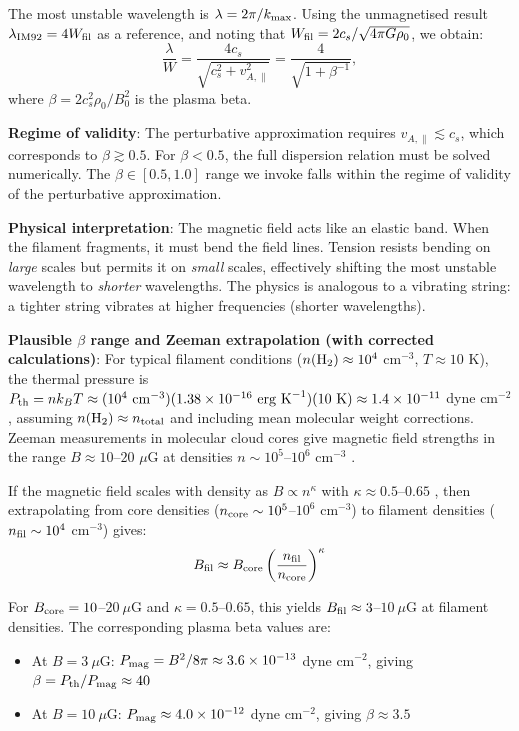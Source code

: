\documentclass[11pt,a4paper]{article}
\begin{document}
The most unstable wavelength is $\lambda = 2\pi/k_{\rm max}$. Using the unmagnetised result $\lambda_{\rm IM92} = 4W_{\rm fil}$ as a reference, and noting that $W_{\rm fil} = 2c_s/\sqrt{4\pi G\rho_0}$, we obtain:
\begin{equation}
\frac{\lambda}{W} = \frac{4c_s}{\sqrt{c_s^2 + v_{A,\parallel}^2}} = \frac{4}{\sqrt{1 + \beta^{-1}}},
\label{eq:tension_lambda}
\end{equation}
where $\beta = 2c_s^2\rho_0/B_0^2$ is the plasma beta.

\textbf{Regime of validity}: The perturbative approximation requires $v_{A,\parallel} \lesssim c_s$, which corresponds to $\beta \gtrsim 0.5$. For $\beta < 0.5$, the full dispersion relation must be solved numerically. The $\beta \in [0.5, 1.0]$ range we invoke falls within the regime of validity of the perturbative approximation.

\textbf{Physical interpretation}: The magnetic field acts like an elastic band. When the filament fragments, it must bend the field lines. Tension resists bending on \textit{large} scales but permits it on \textit{small} scales, effectively shifting the most unstable wavelength to \textit{shorter} wavelengths. The physics is analogous to a vibrating string: a tighter string vibrates at higher frequencies (shorter wavelengths).

\textbf{Plausible $\beta$ range and Zeeman extrapolation (with corrected calculations)}: For typical filament conditions ($n({\rm H_2}) \approx 10^4$ cm$^{-3}$, $T \approx 10$ K), the thermal pressure is $P_{\rm th} = n k_B T \approx (10^4~{\rm cm}^{-3})(1.38\times10^{-16}~{\rm erg~K}^{-1})(10~{\rm K}) \approx 1.4\times10^{-11}$ dyne cm$^{-2}$, assuming $n({\rm H}_2) \approx n_{\rm total}$ and including mean molecular weight corrections. Zeeman measurements in molecular cloud cores give magnetic field strengths in the range $B \approx 10$--$20$ $\mu$G at densities $n \sim 10^5$--$10^6$ cm$^{-3}$ \citep{Crutcher2012}.

If the magnetic field scales with density as $B \propto n^{\kappa}$ with $\kappa \approx 0.5$--$0.65$ \citep{Crutcher2012}, then extrapolating from core densities ($n_{\rm core} \sim 10^5$--$10^6$ cm$^{-3}$) to filament densities ($n_{\rm fil} \sim 10^4$ cm$^{-3}$) gives:
\begin{equation}
B_{\rm fil} \approx B_{\rm core} \left(\frac{n_{\rm fil}}{n_{\rm core}}\right)^{\kappa}
\end{equation}

For $B_{\rm core} = 10$--$20~\mu$G and $\kappa = 0.5$--$0.65$, this yields $B_{\rm fil} \approx 3$--$10~\mu$G at filament densities. The corresponding plasma beta values are:
\begin{itemize}
    \item At $B = 3~\mu$G: $P_{\rm mag} = B^2/8\pi \approx 3.6\times10^{-13}$ dyne cm$^{-2}$, giving $\beta = P_{\rm th}/P_{\rm mag} \approx 40$
    \item At $B = 10~\mu$G: $P_{\rm mag} \approx 4.0\times10^{-12}$ dyne cm$^{-2}$, giving $\beta \approx 3.5$
\end{itemize}
\end{document}
